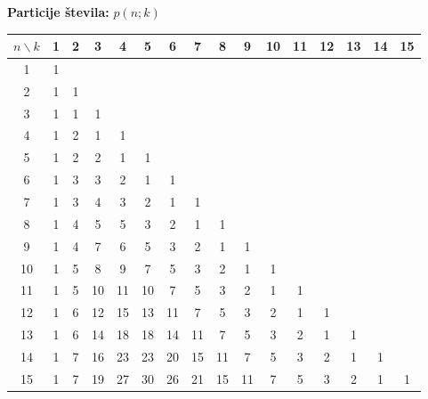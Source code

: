 \documentclass[a4paper,oneside,12pt]{article}
\newenvironment{description*}%
{
\begin{description}
\setlength{\itemsep}{0pt}
\setlength{\parskip}{2pt}
}
{\end{description}}
\begin{document}
\begin{description*}
{    \textbf{Particije števila:} $p(n; k)$ \\
    \begin{tabular}{|*{16}{c|}}
      \hline
      $n \backslash k$ & 1&2&3&4&5&6&7&8&9&10&11&12&13&14&15 \\ \hline
      1 & 1 &  &  &  &  &  &  &  &  &  &  &  &  &  & \\ \hline
      2 & 1 & 1 &  &  &  &  &  &  &  &  &  &  &  &  & \\ \hline
      3 & 1 & 1 & 1 &  &  &  &  &  &  &  &  &  &  &  & \\ \hline
      4 & 1 & 2 & 1 & 1 &  &  &  &  &  &  &  &  &  &  & \\ \hline
      5 & 1 & 2 & 2 & 1 & 1 &  &  &  &  &  &  &  &  &  & \\ \hline
      6 & 1 & 3 & 3 & 2 & 1 & 1 &  &  &  &  &  &  &  &  & \\ \hline
      7 & 1 & 3 & 4 & 3 & 2 & 1 & 1 &  &  &  &  &  &  &  & \\ \hline
      8 & 1 & 4 & 5 & 5 & 3 & 2 & 1 & 1 &  &  &  &  &  &  & \\ \hline
      9 & 1 & 4 & 7 & 6 & 5 & 3 & 2 & 1 & 1 &  &  &  &  &  & \\ \hline
      10 & 1 & 5 & 8 & 9 & 7 & 5 & 3 & 2 & 1 & 1 &  &  &  &  & \\ \hline
      11 & 1 & 5 & 10 & 11 & 10 & 7 & 5 & 3 & 2 & 1 & 1 &  &  &  & \\ \hline
      12 & 1 & 6 & 12 & 15 & 13 & 11 & 7 & 5 & 3 & 2 & 1 & 1 &  &  & \\ \hline
      13 & 1 & 6 & 14 & 18 & 18 & 14 & 11 & 7 & 5 & 3 & 2 & 1 & 1 &  & \\ \hline
      14 & 1 & 7 & 16 & 23 & 23 & 20 & 15 & 11 & 7 & 5 & 3 & 2 & 1 & 1 & \\ \hline
      15 & 1 & 7 & 19 & 27 & 30 & 26 & 21 & 15 & 11 & 7 & 5 & 3 & 2 & 1 & 1\\ \hline
    \end{tabular}
    } %

    \newpage


\end{description*}
\end{document}
